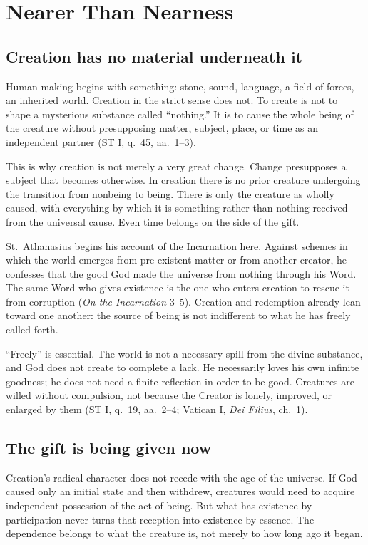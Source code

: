 \section{Nearer Than Nearness}

\subsection{Creation has no material underneath it}

Human making begins with something: stone, sound, language, a field of forces, an inherited world. Creation in the strict sense does not. To create  is not to shape a mysterious substance called ``nothing.'' It is to cause the whole being of the creature without presupposing matter, subject, place, or time as an independent partner (ST I, q.~45, aa.~1--3).

This is why creation is not merely a very great change. Change presupposes a subject that becomes otherwise. In creation there is no prior creature undergoing the transition from nonbeing to being. There is only the creature as wholly caused, with everything by which it is something rather than nothing received from the universal cause. Even time belongs on the side of the gift.

St.~Athanasius begins his account of the Incarnation here. Against schemes in which the world emerges from pre-existent matter or from another creator, he confesses that the good God made the universe from nothing through his Word. The same Word who gives existence is the one who enters creation to rescue it from corruption (\emph{On the Incarnation} 3--5). Creation and redemption already lean toward one another: the source of being is not indifferent to what he has freely called forth.

``Freely'' is essential. The world is not a necessary spill from the divine substance, and God does not create to complete a lack. He necessarily loves his own infinite goodness; he does not need a finite reflection in order to be good. Creatures are willed without compulsion, not because the Creator is lonely, improved, or enlarged by them (ST I, q.~19, aa.~2--4; Vatican I, \emph{Dei Filius}, ch.~1).

\subsection{The gift is being given now}

Creation's radical character does not recede with the age of the universe. If God caused only an initial state and then withdrew, creatures would need to acquire independent possession of the act of being. But what has existence by participation never turns that reception into existence by essence. The dependence belongs to what the creature is, not merely to how long ago it began.

